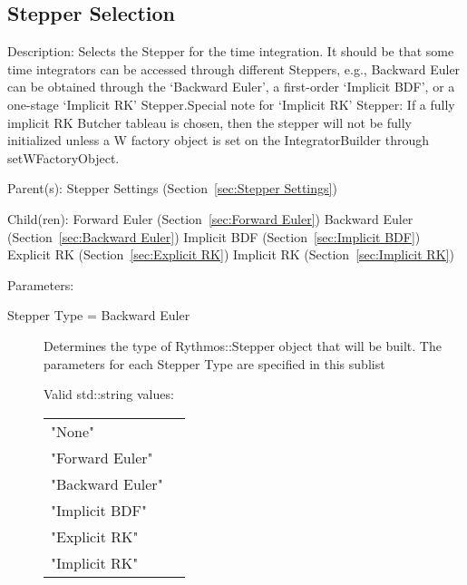 \subsection{Stepper Selection}
\label{sec:Stepper Selection}

\begin{list}{}
  {\setlength{\leftmargin}{1.0in}
   \setlength{\labelwidth}{0.75in}
   \setlength{\labelsep}{0.125in}}
  \item[Description:]
    Selects the Stepper for the time integration.  It should be that some time integrators can be accessed through different Steppers, e.g., Backward Euler can be obtained through the `Backward Euler', a first-order `Implicit BDF', or a one-stage `Implicit RK' Stepper.Special note for `Implicit RK' Stepper:  If a fully implicit RK Butcher tableau is chosen, then the stepper will not be fully initialized unless a W factory object is set on the IntegratorBuilder through setWFactoryObject.
  \item[Parent(s):]
    Stepper Settings (Section~\ref{sec:Stepper Settings})
  \item[Child(ren):]
    Forward Euler (Section~\ref{sec:Forward Euler})
      \newline 
    Backward Euler (Section~\ref{sec:Backward Euler})
      \newline 
    Implicit BDF (Section~\ref{sec:Implicit BDF})
      \newline 
    Explicit RK (Section~\ref{sec:Explicit RK})
      \newline 
    Implicit RK (Section~\ref{sec:Implicit RK})
  \item[Parameters:]
    \begin{description}
      \item[Stepper Type = Backward Euler] 
Determines the type of Rythmos::Stepper object that will be built.
The parameters for each Stepper Type are specified in this sublist

  Valid std::string values:

      \begin{tabular}{lp{}}
      "None" & \\ 
      "Forward Euler" & \\ 
      "Backward Euler" & \\ 
      "Implicit BDF" & \\ 
      "Explicit RK" & \\ 
      "Implicit RK" & \\ 
      \end{tabular}
\end{description}

\end{list}

